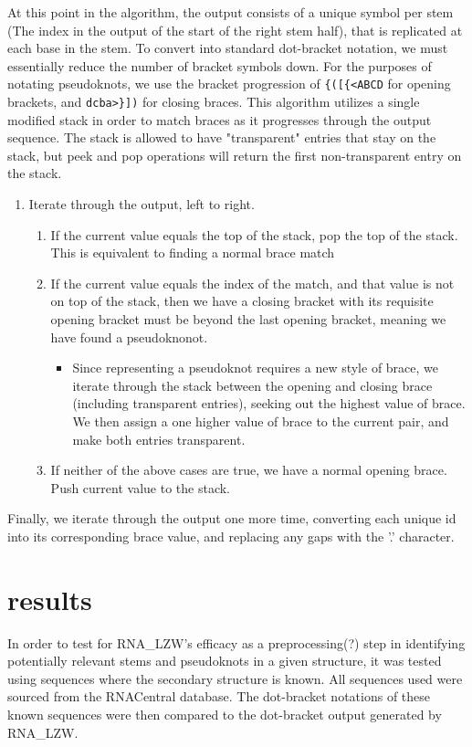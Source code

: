 \documentclass[sigconf]{acmart}
\begin{document}
At this point in the algorithm, the output consists of a unique symbol per stem (The index in the output of the start of the right stem half), that is replicated at each base in the stem. To convert into standard dot-bracket notation, we must essentially reduce the number of bracket symbols down. For the purposes of notating pseudoknots, we use the bracket progression of \verb|{([{<ABCD| for opening brackets, and \verb|dcba>}])| for closing braces.
This algorithm utilizes a single modified stack in order to match braces as it progresses through the output sequence. The stack is allowed to have "transparent" entries that stay on the stack, but peek and pop operations will return the first non-transparent entry on the stack.
\begin{enumerate}
	\item Iterate through the output, left to right.
		\begin{enumerate}
		\item If the current value equals the top of the stack, pop the top of the stack. This is equivalent to finding a normal brace match
		\item If the current value equals the index of the match, and that value is not on top of the stack, then we have a closing bracket with its requisite opening bracket must be beyond the last opening bracket, meaning we have found a pseudoknonot.
			\begin{itemize}
			\item Since representing a pseudoknot requires a new style of brace, we iterate through the stack between the opening and closing brace (including transparent entries), seeking out the highest value of brace. We then assign a one higher value of brace to the current pair, and make both entries transparent. 
			\end{itemize}
		\item If neither of the above cases are true, we have a normal opening brace. Push current value to the stack.
		\end{enumerate}
\end{enumerate}
Finally, we iterate through the output one more time, converting each unique id into its corresponding brace value, and replacing any gaps with the '.' character.


\section{results}

In order to test for RNA\_LZW's efficacy as a preprocessing(?) step in identifying potentially relevant stems and pseudoknots in a given structure, it was tested using sequences where the secondary structure is known.  All sequences used were sourced from the RNACentral database. The dot-bracket notations of these known sequences were then compared to the dot-bracket output generated by RNA\_LZW.
\end{document}
